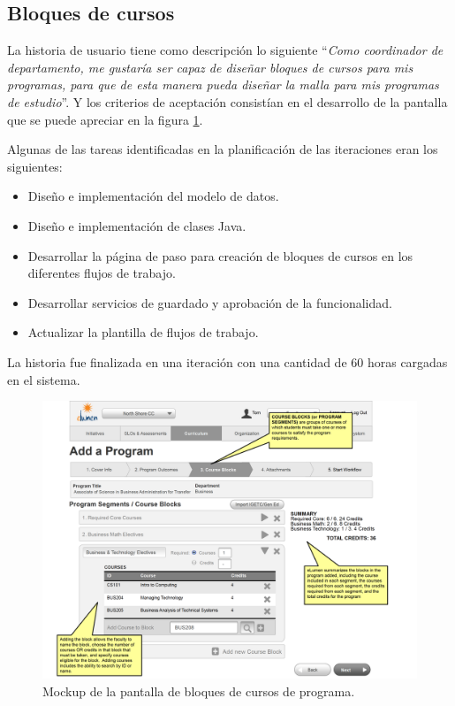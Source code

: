 \subsection{Bloques de cursos}
La historia de usuario tiene como descripción lo siguiente \enquote{\textit{Como coordinador de departamento, me gustaría ser capaz de diseñar bloques de cursos para mis programas, para que de esta manera pueda diseñar la malla para mis programas de estudio}}. Y los criterios de aceptación consistían en el desarrollo de la pantalla que se puede apreciar en la figura \ref{program_course_blocks}.

Algunas de las tareas identificadas en la planificación de las iteraciones eran los siguientes:
\begin{itemize}
	\item Diseño e implementación del modelo de datos.
	\item Diseño e implementación de clases Java.
	\item Desarrollar la página de paso para creación de bloques de cursos en los diferentes flujos de trabajo.
	\item Desarrollar servicios de guardado y aprobación de la funcionalidad.
	\item Actualizar la plantilla de flujos de trabajo.
\end{itemize}

La historia fue finalizada en una iteración con una cantidad de 60 horas cargadas en el sistema.

\begin{figure}[H]
\centering
\includegraphics[width=125mm,scale=1]{Capitulos/DesarrollodelaAplicacion/Imagenes/program_course_blocks}
\caption{Mockup de la pantalla de bloques de cursos de programa.}
  \label{program_course_blocks}
\end{figure}

